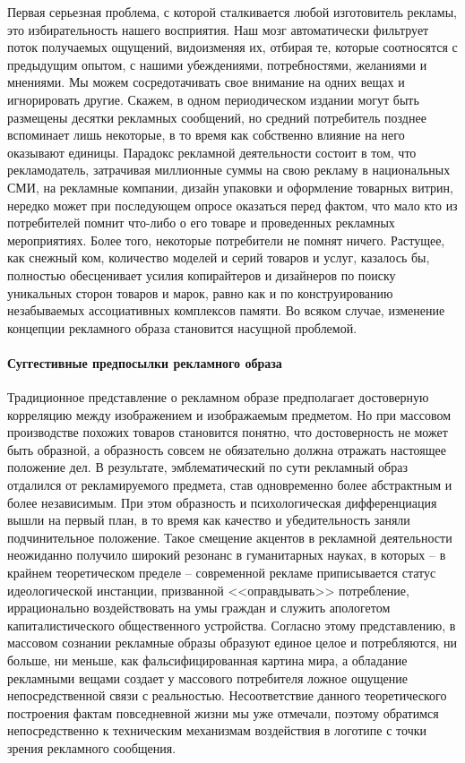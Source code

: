 Первая серьезная проблема, с которой сталкивается любой изготовитель рекламы,
это избирательность нашего восприятия. Наш мозг автоматически фильтрует поток
получаемых ощущений, видоизменяя их, отбирая те, которые соотносятся с
предыдущим опытом, с нашими убеждениями, потребностями, желаниями и мнениями.
Мы можем сосредотачивать свое внимание на одних вещах и игнорировать другие.
Скажем, в одном периодическом издании могут быть размещены десятки  рекламных
сообщений, но средний потребитель позднее вспоминает лишь некоторые, в то время
как собственно влияние на него оказывают единицы. Парадокс рекламной
деятельности состоит в том, что рекламодатель, затрачивая миллионные суммы на
свою рекламу в национальных СМИ, на рекламные компании, дизайн упаковки и
оформление товарных витрин, нередко может при последующем опросе оказаться
перед фактом, что мало кто из потребителей помнит что-либо о его товаре и
проведенных рекламных мероприятиях. Более того, некоторые потребители не помнят
ничего. Растущее, как снежный ком, количество моделей и серий товаров и услуг,
казалось бы,  полностью обесценивает усилия копирайтеров и дизайнеров по поиску
уникальных сторон товаров и марок, равно как и  по конструированию незабываемых
ассоциативных комплексов памяти. Во всяком случае, изменение концепции
рекламного образа становится насущной проблемой.

\paragraph{Суггестивные предпосылки рекламного образа}
Традиционное представление о рекламном образе предполагает достоверную
корреляцию между изображением и изображаемым предметом. Но при массовом
производстве похожих товаров становится понятно, что достоверность не может
быть образной, а образность совсем не обязательно должна отражать настоящее
положение дел. В результате, эмблематический по сути рекламный образ отдалился
от рекламируемого предмета, став  одновременно более абстрактным и более
независимым. При этом образность и психологическая дифференциация вышли на
первый план, в то время как качество и убедительность заняли подчинительное
положение. Такое смещение акцентов в рекламной деятельности неожиданно получило
широкий резонанс в гуманитарных науках, в которых -- в крайнем теоретическом
пределе -- современной рекламе приписывается статус идеологической инстанции,
призванной <<оправдывать>> потребление, иррационально воздействовать на умы
граждан и служить апологетом капиталистического общественного устройства.
Согласно этому представлению, в массовом сознании рекламные образы образуют
единое целое и потребляются, ни больше, ни меньше, как фальсифицированная
картина мира, а обладание рекламными вещами создает у массового потребителя
ложное ощущение непосредственной связи с реальностью.\autocite{bodriyar1999sistema}
Несоответствие данного теоретического построения фактам повседневной жизни мы
уже отмечали,  поэтому обратимся непосредственно к техническим механизмам
воздействия в логотипе с точки зрения рекламного сообщения.

